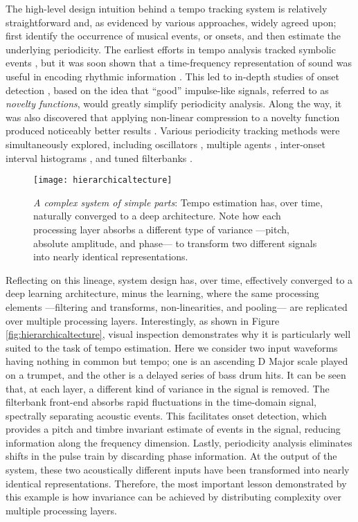 The high-level design intuition behind a tempo tracking system is relatively straightforward and, as evidenced by various approaches, widely agreed upon; first identify the occurrence of musical events, or onsets, and then estimate the underlying periodicity.
The earliest efforts in tempo analysis tracked symbolic events \cite{Dannenberg1984}, but it was soon shown that a time-frequency representation of sound was useful in encoding rhythmic information \cite{Scheirer1998}.
This led to in-depth studies of onset detection \cite{Bello2005}, based on the idea that ``good'' impulse-like signals, referred to as \emph{novelty functions}, would greatly simplify periodicity analysis.
Along the way, it was also discovered that applying non-linear compression to a novelty function produced noticeably better results \cite{Klapuri2006}.
Various periodicity tracking methods were simultaneously explored, including oscillators \cite{Large1994}, multiple agents \cite{Goto1995}, inter-onset interval histograms \cite{Dixon2007}, and tuned filterbanks \cite{Grosche2011}.

\begin{figure}
\begin{centering}
\texttt{[image: hierarchicaltecture]}
\caption{\emph{A complex system of simple parts}: Tempo estimation has, over time, naturally converged to a deep architecture. Note how each processing layer absorbs a different type of variance ---pitch, absolute amplitude, and phase--- to transform two different signals into nearly identical representations.}
\label{fig:deeparchs}
\end{centering}
\end{figure}

Reflecting on this lineage, system design has, over time, effectively converged to a deep learning architecture, minus the learning, where the same processing elements ---filtering and transforms, non-linearities, and pooling--- are replicated over multiple processing layers.
Interestingly, as shown in Figure \ref{fig:hierarchicaltecture}, visual inspection demonstrates why it is particularly well suited to the task of tempo estimation.
Here we consider two input waveforms having nothing in common but tempo; one is an ascending D Major scale played on a trumpet, and the other is a delayed series of bass drum hits.
It can be seen that, at each layer, a different kind of variance in the signal is removed.
The filterbank front-end absorbs rapid fluctuations in the time-domain signal, spectrally separating acoustic events.
This facilitates onset detection, which provides a pitch and timbre invariant estimate of events in the signal, reducing information along the frequency dimension.
Lastly, periodicity analysis eliminates shifts in the pulse train by discarding phase information.
At the output of the system, these two acoustically different inputs have been transformed into nearly identical representations.
Therefore, the most important lesson demonstrated by this example is how invariance can be achieved by distributing complexity over multiple processing layers.

